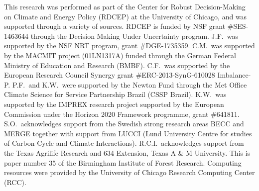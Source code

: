 \documentclass[gmd, manuscript]{copernicus} %
\begin{document}


\begin{acknowledgements}
This research was performed as part of the Center for Robust Decision-Making on Climate and Energy Policy (RDCEP) at the University of Chicago, and was supported through a variety of sources. 
RDCEP is funded by NSF grant \#SES-1463644 through the Decision Making Under Uncertainty program. 
J.F.\ was supported by the NSF NRT program, grant \#DGE-1735359. 
C.M.\ was supported by the MACMIT project (01LN1317A) funded through the German Federal Ministry of Education and Research (BMBF). 
C.F.\ was supported by the European Research Council Synergy grant \#ERC-2013-SynG-610028 Imbalance-P. 
P.F.\ and K.W.\ were supported  by the Newton Fund through the Met Office Climate Science for Service Partnership Brazil (CSSP Brazil). 
K.W.\ was supported by the IMPREX research project supported by the European Commission under the Horizon 2020 Framework programme, grant \#641811. 
S.O.\ acknowledges support from the Swedish strong research areas BECC and MERGE together with support from LUCCI (Lund University Centre for studies of Carbon Cycle and Climate Interactions). 
R.C.I.\ acknowledges support from the Texas Agrilife Research and 634 Extension, Texas A \& M University. 
This is paper number 35 of the Birmingham Institute of Forest Research. 
Computing resources were provided by the University of Chicago Research Computing Center (RCC).
\end{acknowledgements}



\end{document}
